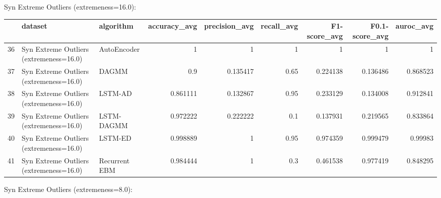 Syn Extreme Outliers (extremeness=16.0):

\begin{tabular}{rllrrrrrr}
\hline
    & dataset                                 & algorithm     &   accuracy\_avg &   precision\_avg &   recall\_avg &   F1-score\_avg &   F0.1-score\_avg &   auroc\_avg \\
\hline
 36 & Syn Extreme Outliers (extremeness=16.0) & AutoEncoder   &       1        &        1        &         1    &       1        &         1        &    1        \\
 37 & Syn Extreme Outliers (extremeness=16.0) & DAGMM         &       0.9      &        0.135417 &         0.65 &       0.224138 &         0.136486 &    0.868523 \\
 38 & Syn Extreme Outliers (extremeness=16.0) & LSTM-AD       &       0.861111 &        0.132867 &         0.95 &       0.233129 &         0.134008 &    0.912841 \\
 39 & Syn Extreme Outliers (extremeness=16.0) & LSTM-DAGMM    &       0.972222 &        0.222222 &         0.1  &       0.137931 &         0.219565 &    0.833864 \\
 40 & Syn Extreme Outliers (extremeness=16.0) & LSTM-ED       &       0.998889 &        1        &         0.95 &       0.974359 &         0.999479 &    0.99983  \\
 41 & Syn Extreme Outliers (extremeness=16.0) & Recurrent EBM &       0.984444 &        1        &         0.3  &       0.461538 &         0.977419 &    0.848295 \\
\hline
\end{tabular}

Syn Extreme Outliers (extremeness=8.0):

